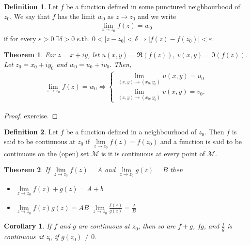 \documentclass[12pt, a4paper]{article}
\theoremstyle{plain}
\newtheorem{thm}{Theorem} %
\newtheorem{cor}{Corollary}
\theoremstyle{definition}
\newtheorem{definition}{Definition} %
\begin{document}
			\begin{definition}
				Let $f$ be a function defined in some punctured neighbourhood of $z_0$. We say that $f$ has the limit $w_0$ as $z\to z_0$ and we write
				\begin{align*}
					\lim\limits_{z\to z_0}f(z) = w_0
				\end{align*}
				if for every $\varepsilon>0\:\exists \delta>0$ s.th. $0<|z-z_0|<\delta \Rightarrow |f(z)-f(z_0)|<\varepsilon$.\\
			\end{definition}

			\begin{thm}
				For $z=x+iy$, let $u(x,y)=\Re(f(z))$, $v(x,y) = \Im(f(z))$. Let $z_0=x_0+iy_0$ and $w_0=u_0+iv_0$. Then,
				\begin{align*}
					\lim\limits_{z\to z_0}f(z) = w_0 \iff
					\begin{cases}
						\lim\limits_{(x,y)\to(x_0,y_0)}u(x,y) = u_0\\
						\lim\limits_{(x,y)\to(x_0,y_0)}v(x,y) = v_0.
					\end{cases}
				\end{align*}
			\end{thm}
			\begin{proof}
				exercise.
			\end{proof}

			\begin{definition}
				Let $f$ be a function defined in a neighbourhood of $z_0.$ Then $f$ is said to be continuous at $z_0$ if $\lim\limits_{z\to z_0}f(z) = f(z_0)$ and a function is said to be continuous on the (open) set $\mathcal{M}$ is it is continuous at every point of $\mathcal{M}$.\\
			\end{definition}

			\begin{thm}
				If $\lim\limits_{z\to z_0}f(z) = A$ and $\lim\limits_{z\to z_0}g(z) = B$ then
				\begin{itemize}
					\item $\lim\limits_{z\to z_0}f(z)+g(z) = A+b$
					\item $\lim\limits_{z\to z_0}f(z)g(z) = AB$
					$\lim\limits_{z\to z_0}\frac{f(z)}{g(z)} = \frac{A}{B}$\\
				\end{itemize}
			\end{thm}

			\begin{cor}
				If $f$ and $g$ are continuous at $z_0$, then so are $f+g$, $fg$, and $\frac{f}{g}$ is continuous at $z_0$ if $g(z_0)\not=0$.\\
			\end{cor}
\end{document}
